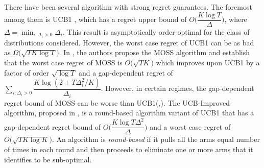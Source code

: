 	There have been several algorithm with strong regret guarantees. The foremost among them is UCB1 \cite{auer2002finite}, which has a regret upper bound of $O\bigg(\dfrac{K\log T}{\Delta}\bigg)$, where $\Delta = \min_{i:\Delta_i>0} \Delta_i$. This result is asymptotically order-optimal for the class of distributions considered. However, the worst case regret of UCB1  can be as bad as $\Omega \bigg(\sqrt{TK\log T}\bigg)$.  In \cite{audibert2009minimax}, the authors propose the MOSS algorithm and establish that the worst case regret of MOSS is $O\bigg(\sqrt{TK}\bigg)$ which improves upon UCB1 by a factor of order $\sqrt{\log T}$ and a gap-dependent regret of $\sum_{i:\Delta_{i}>0}\dfrac{K\log(2+T\Delta_{i}^{2}/K)}{\Delta_{i}}$. However, in certain regimes, the gap-dependent regret bound of MOSS can be worse than UCB1(\cite{audibert2009minimax},\cite{lattimore2015optimally}). The UCB-Improved algorithm, proposed in \cite{auer2010ucb}, is a round-based algorithm variant of UCB1 that 
has a gap-dependent regret bound of $O\bigg(\dfrac{K\log T\Delta^{2}}{\Delta}\bigg)$ and a worst case regret of $O\bigg(\sqrt{TK\log K}\bigg)$. An algorithm is \textit{round-based} if it pulls all the arms equal number of times in each round and then proceeds to eliminate one or more arms that it identifies to be sub-optimal.

	
